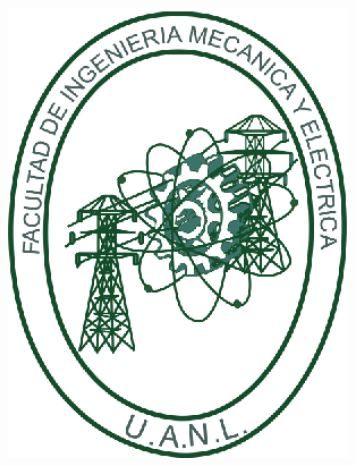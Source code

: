 \documentclass[a0,portrait]{a0poster}
\begin{document}
\begin{minipage}[b]{0.20\linewidth}
    \begin{center}
        \includegraphics[width=9cm]{fime.eps}\\
        \vspace{5cm}    
    \end{center}
\end{minipage}

\vspace{1cm}
\end{document}
